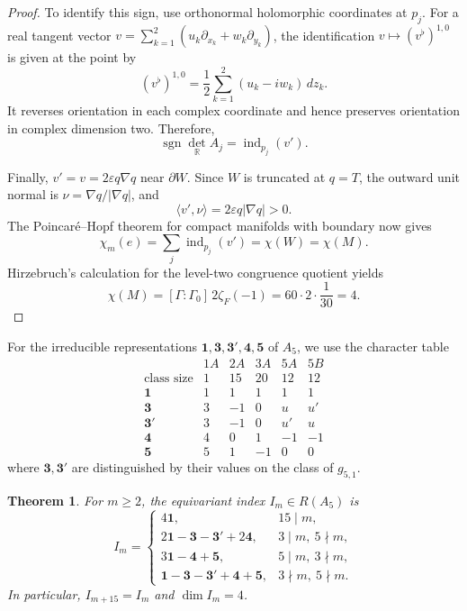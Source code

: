 \documentclass[11pt]{article}
\theoremstyle{definition}
\theoremstyle{plain}
\numberwithin{equation}{section}
\newtheorem{theorem}{Theorem}[section]
\begin{document}
\begin{proof}
To identify this sign, use orthonormal
holomorphic coordinates at $p_j$.
For a real tangent vector
$v=\sum_{k=1}^2
(u_k\partial_{x_k}+w_k\partial_{y_k})$,
the identification $v\mapsto(v^\flat)^{1,0}$
is given at the point by
\[
  (v^\flat)^{1,0}
  =\frac12\sum_{k=1}^2
  (u_k-iw_k)\,dz_k.
\]
It reverses orientation in each complex
coordinate and hence preserves orientation
in complex dimension two. Therefore,
\[
  \operatorname{sgn}\det_{\mathbb R}A_j
  =\operatorname{ind}_{p_j}(v').
\]

Finally, $v'=v=2\varepsilon q\nabla q$
near $\partial W$. Since $W$ is truncated
at $q=T$, the outward unit normal is
$\nu=\nabla q/|\nabla q|$, and
\[
  \langle v',\nu\rangle
  =2\varepsilon q|\nabla q|>0.
\]
The Poincar\'e--Hopf theorem for compact
manifolds with boundary
\cite[Theorem~2.3.1]{RobbinSalamon}
now gives
\[
  \chi_m(e)
  =\sum_j\operatorname{ind}_{p_j}(v')
  =\chi(W)=\chi(M).
\]
Hirzebruch's calculation for the level-two
congruence quotient
\cite[\S5, p.~158]{Hirzebruch76} yields
\[
  \chi(M)
  =[\Gamma:\Gamma_0]\,2\zeta_F(-1)
  =60\cdot2\cdot\frac1{30}=4.
\]
\end{proof}

For the irreducible representations
$\mathbf1,\mathbf3,\mathbf3',\mathbf4,\mathbf5$ of $A_5$,
we use the character table
\begin{equation}\label{eq:a5-character-table}
\begin{array}{c|rrrrr}
&1A&2A&3A&5A&5B\\\hline
\text{class size}&1&15&20&12&12\\\hline
\mathbf1&1&1&1&1&1\\
\mathbf3&3&-1&0&u&u'\\
\mathbf3'&3&-1&0&u'&u\\
\mathbf4&4&0&1&-1&-1\\
\mathbf5&5&1&-1&0&0
\end{array}
\end{equation}
where $\mathbf3,\mathbf3'$ are distinguished by their
values on the class of $g_{5,1}$.

\begin{theorem}\label{thm:a5-index}
For $m\geq2$, the equivariant index $I_m\in R(A_5)$ is
\begin{equation}\label{eq:a5-decomposition}
I_m=
\begin{cases}
4\mathbf1,&15\mid m,\\
2\mathbf1-\mathbf3-\mathbf3'+2\mathbf4,
    &3\mid m,\ 5\nmid m,\\
3\mathbf1-\mathbf4+\mathbf5,
    &5\mid m,\ 3\nmid m,\\
\mathbf1-\mathbf3-\mathbf3'+\mathbf4+\mathbf5,
    &3\nmid m,\ 5\nmid m.
\end{cases}
\end{equation}
In particular, $I_{m+15}=I_m$ and $\dim I_m=4$.
\end{theorem}
\end{document}
